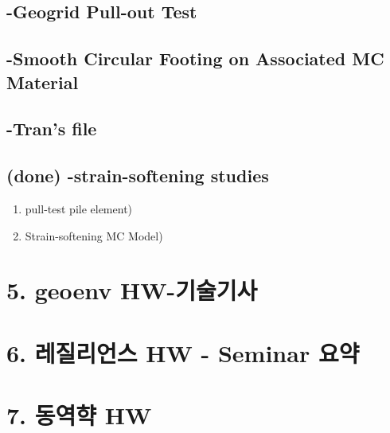 \documentclass[a4paper, nobind]{templates/ociamthesis}
\providecommand{\tightlist}{%
  \setlength{\itemsep}{0pt}\setlength{\parskip}{0pt}}
\newcommand*{\bibtitle}{Works Cited}
\begin{document}
\hypertarget{geogrid-pull-out-test}{%
\subsection{-Geogrid Pull-out Test}\label{geogrid-pull-out-test}}

\hypertarget{smooth-circular-footing-on-associated-mc-material}{%
\subsection{-Smooth Circular Footing on Associated MC Material}\label{smooth-circular-footing-on-associated-mc-material}}

\hypertarget{trans-file}{%
\subsection{-Tran's file}\label{trans-file}}

\hypertarget{done--strain-softening-studies}{%
\subsection{(done) -strain-softening studies}\label{done--strain-softening-studies}}

\begin{enumerate}
\def\labelenumi{\arabic{enumi}.}
\tightlist
\item
  pull-test pile element)
\item
  Strain-softening MC Model)
\end{enumerate}

\hypertarget{geoenv-hw-uxae30uxc220uxae30uxc0ac}{%
\section{5. geoenv HW-기술기사}\label{geoenv-hw-uxae30uxc220uxae30uxc0ac}}

\hypertarget{uxb808uxc9c8uxb9acuxc5b8uxc2a4-hw---seminar-uxc694uxc57d}{%
\section{6. 레질리언스 HW - Seminar 요약}\label{uxb808uxc9c8uxb9acuxc5b8uxc2a4-hw---seminar-uxc694uxc57d}}

\hypertarget{uxb3d9uxc5eduxd591-hw}{%
\section{7. 동역햑 HW}\label{uxb3d9uxc5eduxd591-hw}}


\setlength{\baselineskip}{0pt} %

{\renewcommand*\MakeUppercase[1]{#1}%
\printbibliography[heading=bibintoc,title={\bibtitle}]}
\end{document}
